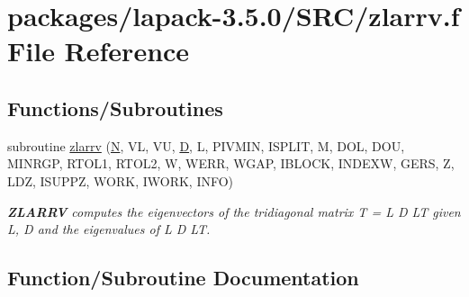 \hypertarget{zlarrv_8f}{}\section{packages/lapack-\/3.5.0/\+S\+R\+C/zlarrv.f File Reference}
\label{zlarrv_8f}
\subsection*{Functions/\+Subroutines}
\begin{DoxyCompactItemize}
\item 
subroutine \hyperlink{zlarrv_8f_a67b538baa0f2ed86a609272209987c8c}{zlarrv} (\hyperlink{polmisc_8c_a0240ac851181b84ac374872dc5434ee4}{N}, V\+L, V\+U, \hyperlink{odrpack_8h_a7dae6ea403d00f3687f24a874e67d139}{D}, L, P\+I\+V\+M\+I\+N, I\+S\+P\+L\+I\+T, M, D\+O\+L, D\+O\+U, M\+I\+N\+R\+G\+P, R\+T\+O\+L1, R\+T\+O\+L2, W, W\+E\+R\+R, W\+G\+A\+P, I\+B\+L\+O\+C\+K, I\+N\+D\+E\+X\+W, G\+E\+R\+S, Z, L\+D\+Z, I\+S\+U\+P\+P\+Z, W\+O\+R\+K, I\+W\+O\+R\+K, I\+N\+F\+O)
\begin{DoxyCompactList}\small\item\em {\bfseries Z\+L\+A\+R\+R\+V} computes the eigenvectors of the tridiagonal matrix T = L D L\+T given L, D and the eigenvalues of L D L\+T. \end{DoxyCompactList}\end{DoxyCompactItemize}


\subsection{Function/\+Subroutine Documentation}
\hypertarget{zlarrv_8f_a67b538baa0f2ed86a609272209987c8c}{}
